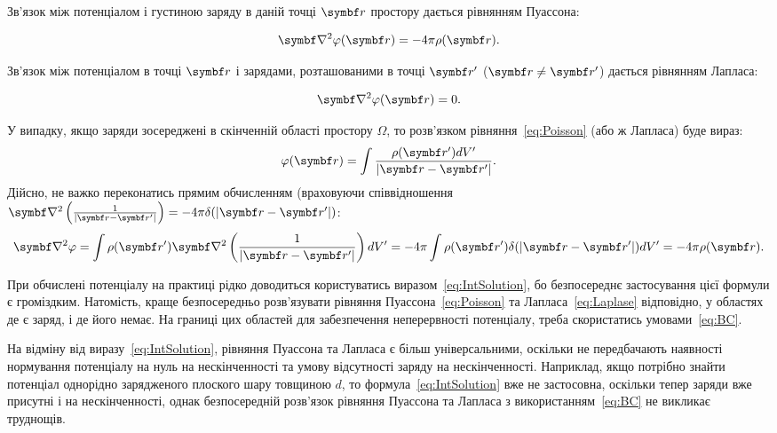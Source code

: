 \documentclass[]{ProblemBook}
\begin{document}
Зв'язок між потенціалом  і густиною заряду в даній точці $\vect{r}$ простору дається рівнянням Пуассона:

\begin{equation}\label{eq:Poisson}
\vect{\nabla}^2\pot(\vect{r}) = -4\pi\rho(\vect{r}).
\end{equation}


Зв'язок між потенціалом в точці $\vect{r}$ і зарядами, розташованими в точці $\vect{r}'$ ($\vect{r} \neq \vect{r}'$) дається рівнянням Лапласа:

\begin{equation}\label{eq:Laplase}
    \vect{\nabla}^2\pot(\vect{r}) = 0.
\end{equation}

У випадку, якщо заряди зосереджені в скінченній області простору $\Omega$, то розв'язком рівняння~\eqref{eq:Poisson} (або ж Лапласа) буде вираз:
\begin{equation}\label{eq:IntSolution}
\pot(\vect{r}) = \int\frac{\rho(\vect{r}') dV'}{|\vect{r} - \vect{r}'|}.
\end{equation}
Дійсно, не важко переконатись прямим обчисленням (враховуючи співвідношен\-ня $\vect{\nabla}^2\left( \frac{1}{|\vect{r} - \vect{r}'|}\right) = -4\pi\delta(|\vect{r} - \vect{r}'|) $:
\[
    \vect{\nabla}^2 \pot = \int\rho(\vect{r}') \vect{\nabla}^2\left( \frac{1}{|\vect{r} - \vect{r}'|}\right)  dV' =  -4\pi\int\rho(\vect{r}') \delta(|\vect{r} - \vect{r}'|)  dV' = -4\pi\rho(\vect{r}).
\]


При обчислені потенціалу на практиці  рідко доводиться користуватись виразом~\eqref{eq:IntSolution}, бо безпосереднє застосування цієї формули є громіздким.  Натомість, краще  безпосередньо розв'язувати рівняння Пуассона~\eqref{eq:Poisson} та Лапласа~\eqref{eq:Laplase} відповідно, у областях де є заряд, і де його немає. На границі цих областей для забезпечення неперервності потенціалу, треба скористатись умовами~\eqref{eq:BC}.

На відміну від  виразу~\eqref{eq:IntSolution}, рівняння Пуассона та Лапласа є більш універсальними, оскільки не передбачають наявності  нормування потенціалу на нуль на нескінченності та умову відсутності заряду на нескінченності. Наприклад, якщо потрібно знайти потенціал однорідно зарядженого плоского шару товщиною $d$, то формула~\eqref{eq:IntSolution} вже не застосовна, оскільки тепер заряди вже присутні і на нескінченності, однак безпосередній розв'язок рівняння Пуассона та Лапласа з використанням~\eqref{eq:BC} не викликає труднощів. 
\end{document}
